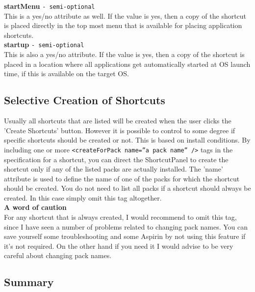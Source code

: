 \textbf{startMenu} \texttt{- semi-optional}\\

This is a yes/no attribute as well. If the value is yes, then a copy of
the shortcut is placed directly in the top most menu that is available
for placing application shortcuts.\\

\textbf{startup} \texttt{- semi-optional}\\

This is also a yes/no attribute. If the value is yes, then a copy of the
shortcut is placed in a location where all applications get automatically
started at OS launch time, if this is available on the target OS.\\

\subsection{Selective Creation of Shortcuts}

Usually all shortcuts that are listed will be created when the user
clicks the 'Create Shortcuts' button. However it is possible to
control to some degree if specific shortcuts should be created or
not. This is based on install conditions. By including one or more
\texttt{<createForPack name=''a pack name'' />} tags in the
specification for a shortcut, you can direct the ShortcutPanel to
create the shortcut only if any of the listed packs are actually
installed. The 'name' attribute is used to define the name of one of
the packs for which the shortcut should be created. You do not need to
list all packs if a shortcut should always be created. In this case
simply omit this tag altogether.\\

\textbf{A word of caution}\\

For any shortcut that is always created, I would recommend to omit this
tag, since I have seen a number of problems related to changing pack
names. You can save yourself some troubleshooting and some Aspirin by
not using this feature if it's not required. On the other hand if you
need it I would advise to be very careful about changing pack names.\\

\subsection{Summary}

